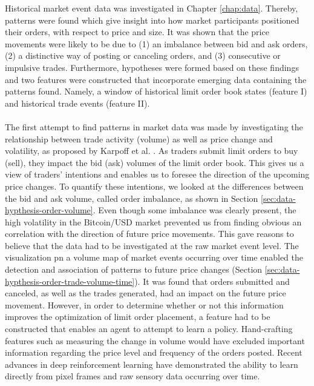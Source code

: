     Historical market event data was investigated in Chapter \ref{chap:data}. 
    Thereby, patterns were found which give insight into how market participants positioned their orders, with respect to price and size. 
    It was shown that the price movements were likely to be due to (1) an imbalance between bid and ask orders, (2) a distinctive way of posting or canceling orders, and (3) consecutive or impulsive trades.
    Furthermore, hypotheses were formed based on these findings and two features were constructed that incorporate emerging data containing the patterns found.
    Namely, a window of historical limit order book states (feature I) and historical trade events (feature II).
    \\
    \\
The first attempt to find patterns in market data was made by investigating the relationship between trade activity (volume) as well as price change and volatility, as proposed by Karpoff et al. \cite{karpoff1987relation}.  
As traders submit limit orders to buy (sell), they impact the bid (ask) volumes of the  limit order book. This gives us a view of traders’ intentions and enables us to foresee the direction of the upcoming price changes.
To quantify these intentions, we looked at the differences between the bid and ask volume, called order imbalance, as shown in Section \ref{sec:data-hypthesis-order-volume}.
Even though some imbalance was clearly present, the high volatility in the Bitcoin/USD market prevented us from finding obvious an correlation with the direction of future price movements.
This gave reasons to believe that the data had to be investigated at the raw market event level\cite{kane2011analyzing}.
The visualization pn a volume map of market events occurring over time enabled the detection and association of patterns to future price changes (Section \ref{sec:data-hypthesis-order-trade-volume-time}).
It was found that orders submitted and canceled, as well as the trades generated, had an impact on the future price movement.
However, in order to determine whether or not this information improves the optimization of limit order placement, a feature had to be constructed that enables an agent to attempt to learn a policy.
Hand-crafting features such as measuring the change in volume would have excluded important information regarding the price level and frequency of the orders posted.
Recent advances in deep reinforcement learning have demonstrated the ability to learn directly from pixel frames\cite{mnih2013playing} and raw sensory data\cite{mnih2015human} occurring over time.
